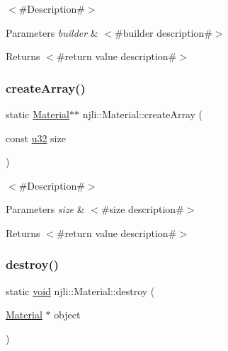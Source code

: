 $<$\#\+Description\#$>$


\begin{DoxyParams}{Parameters}
{\em builder} & $<$\#builder description\#$>$\\
\hline
\end{DoxyParams}
\begin{DoxyReturn}{Returns}
$<$\#return value description\#$>$ 
\end{DoxyReturn}
\mbox{\label{classnjli_1_1_material_ace089b72b670f4dff85bdde77f0c17a4}} 
\subsubsection{\texorpdfstring{create\+Array()}{createArray()}}
{\footnotesize\ttfamily static \mbox{\hyperlink{classnjli_1_1_material}{Material}}$\ast$$\ast$ njli\+::\+Material\+::create\+Array (\begin{DoxyParamCaption}\item[{const \mbox{\hyperlink{_util_8h_a10e94b422ef0c20dcdec20d31a1f5049}{u32}}}]{size }\end{DoxyParamCaption})\hspace{0.3cm}{\ttfamily [static]}}

$<$\#\+Description\#$>$


\begin{DoxyParams}{Parameters}
{\em size} & $<$\#size description\#$>$\\
\hline
\end{DoxyParams}
\begin{DoxyReturn}{Returns}
$<$\#return value description\#$>$ 
\end{DoxyReturn}
\mbox{\label{classnjli_1_1_material_afcb45b24c6865b6743ab60589c255975}} 
\subsubsection{\texorpdfstring{destroy()}{destroy()}}
{\footnotesize\ttfamily static \mbox{\hyperlink{_thread_8h_af1e856da2e658414cb2456cb6f7ebc66}{void}} njli\+::\+Material\+::destroy (\begin{DoxyParamCaption}\item[{\mbox{\hyperlink{classnjli_1_1_material}{Material}} $\ast$}]{object }\end{DoxyParamCaption})\hspace{0.3cm}{\ttfamily [static]}}

